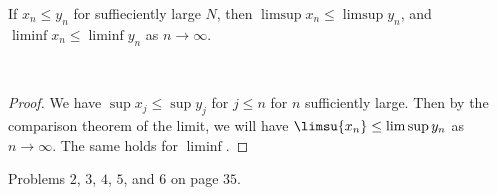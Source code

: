 \begin{theorem}\label{2.5.4}
    If $x_n \leq y_n$ for suffieciently large  $N$, then  $\limsup{x_n} \leq 
    \limsup{y_n}$, and $\liminf{x_n} \leq \liminf{y_n}$ as  $n \rightarrow \infty$. 
\end{theorem}\
\begin{proof}
    We have $\sup{x_j} \leq \sup{y_j}$ for  $j \leq n$ for  $n$ sufficiently large.
    Then by the comparison theorem of the limit, we will have $\limsu{x_n} \leq 
    \limsup{y_n}$ as $n \rightarrow \infty$. The same holds for  $\liminf$.
\end{proof}

\begin{HW} 
    Problems $2$,  $3$, $4$, $5$, and $6$ on  page $35$.
\end{HW}

